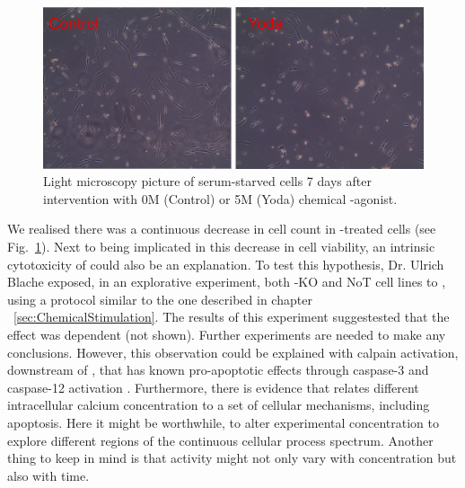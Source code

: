 \begin{figure}[h!]
	\centering
	\includegraphics[width = 0.85\linewidth]{Yoda_Apoptosis.png}
	\caption{Light microscopy picture of serum-starved cells 7 days after intervention with 0\textmu{}M (Control) or 5\textmu{}M (Yoda) chemical \Piezo{}-agonist.}
	\label{pic:Yoda_Apop}
\end{figure}

We realised there was a continuous decrease in cell count in \Yoda{}-treated cells (see Fig.~\ref{pic:Yoda_Apop}). Next to \Piezo{} being implicated in this decrease in cell viability, an intrinsic cytotoxicity of \Yoda{} could also be an explanation. To test this hypothesis, Dr. Ulrich Blache exposed, in an explorative experiment, both \Piezo{}-KO and NoT cell lines to \Yoda{}, using a protocol similar to the one described in chapter ~\vref{sec:ChemicalStimulation}. The results of this experiment suggestested that the effect was \Piezo{} dependent (not shown). Further experiments are needed to make any conclusions. However, this observation could be explained with calpain activation, downstream of \Piezo{}, that has known pro-apoptotic effects through caspase-3 and caspase-12 activation \cite{Altznauer2004, Nakagawa2000}. Furthermore, there is evidence that relates different intracellular calcium concentration to a set of cellular mechanisms, including apoptosis. Here it might be worthwhile, to alter experimental \Yoda{} concentration to explore different regions of the continuous cellular process spectrum. Another thing to keep in mind is that \Yoda{} activity might not only vary with concentration but also with time.

